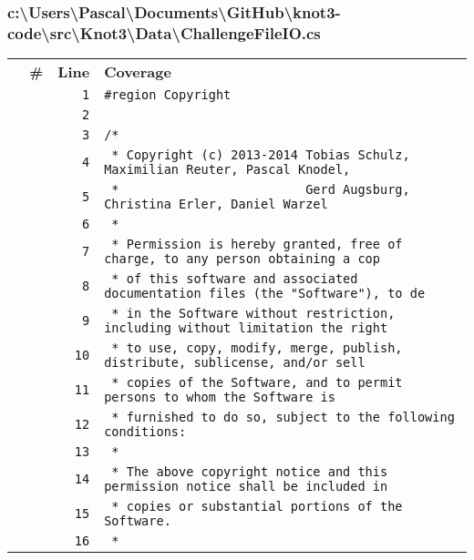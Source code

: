 \documentclass[a4paper,10pt]{article}
\begin{document}
\subsubsection{c:\textbackslash Users\textbackslash Pascal\textbackslash Documents\textbackslash GitHub\textbackslash knot3-code\textbackslash src\textbackslash Knot3\textbackslash Data\textbackslash ChallengeFileIO.cs}
\begin{longtable}[l]{lrrl}
\textbf{} & \textbf{\#} & \textbf{Line} & \textbf{Coverage}\\
\cellcolor{gray} &  & \verb~1~ & \verb~#region Copyright~\\
\cellcolor{gray} &  & \verb~2~ & \verb~~\\
\cellcolor{gray} &  & \verb~3~ & \verb~/*~\\
\cellcolor{gray} &  & \verb~4~ & \verb~ * Copyright (c) 2013-2014 Tobias Schulz, Maximilian Reuter, Pascal Knodel,~\\
\cellcolor{gray} &  & \verb~5~ & \verb~ *                         Gerd Augsburg, Christina Erler, Daniel Warzel~\\
\cellcolor{gray} &  & \verb~6~ & \verb~ *~\\
\cellcolor{gray} &  & \verb~7~ & \verb~ * Permission is hereby granted, free of charge, to any person obtaining a cop~\\
\cellcolor{gray} &  & \verb~8~ & \verb~ * of this software and associated documentation files (the "Software"), to de~\\
\cellcolor{gray} &  & \verb~9~ & \verb~ * in the Software without restriction, including without limitation the right~\\
\cellcolor{gray} &  & \verb~10~ & \verb~ * to use, copy, modify, merge, publish, distribute, sublicense, and/or sell~\\
\cellcolor{gray} &  & \verb~11~ & \verb~ * copies of the Software, and to permit persons to whom the Software is~\\
\cellcolor{gray} &  & \verb~12~ & \verb~ * furnished to do so, subject to the following conditions:~\\
\cellcolor{gray} &  & \verb~13~ & \verb~ *~\\
\cellcolor{gray} &  & \verb~14~ & \verb~ * The above copyright notice and this permission notice shall be included in ~\\
\cellcolor{gray} &  & \verb~15~ & \verb~ * copies or substantial portions of the Software.~\\
\cellcolor{gray} &  & \verb~16~ & \verb~ *~\\

\end{longtable}
\end{document}
